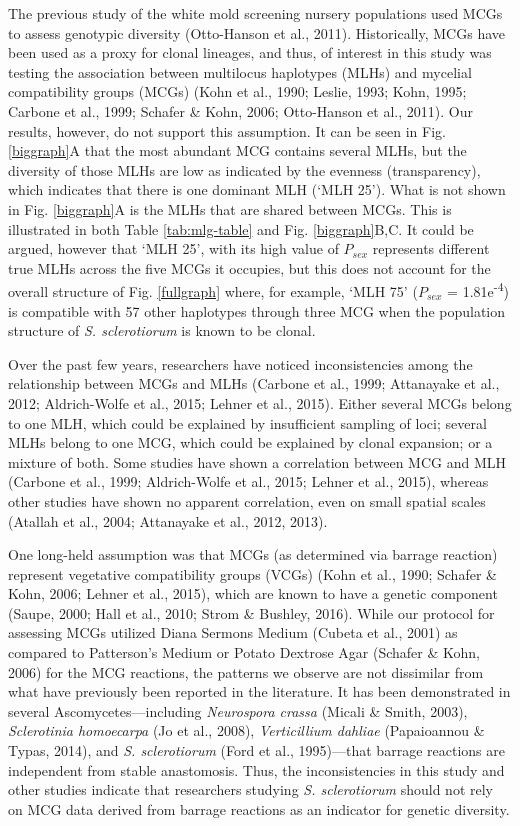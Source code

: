 \documentclass[fleqn,10pt,lineno]{wlpeerj} %
\theoremstyle{definition}
\theoremstyle{definition}
\theoremstyle{definition}
\theoremstyle{remark}
\begin{document}
The previous study of the white mold screening nursery populations used
MCGs to assess genotypic diversity (Otto-Hanson et al., 2011).
Historically, MCGs have been used as a proxy for clonal lineages, and
thus, of interest in this study was testing the association between
multilocus haplotypes (MLHs) and mycelial compatibility groups (MCGs)
(Kohn et al., 1990; Leslie, 1993; Kohn, 1995; Carbone et al., 1999;
Schafer \& Kohn, 2006; Otto-Hanson et al., 2011). Our results, however,
do not support this assumption. It can be seen in Fig. \ref{biggraph}A
that the most abundant MCG contains several MLHs, but the diversity of
those MLHs are low as indicated by the evenness (transparency), which
indicates that there is one dominant MLH (`MLH 25'). What is not shown
in Fig. \ref{biggraph}A is the MLHs that are shared between MCGs. This
is illustrated in both Table \ref{tab:mlg-table} and Fig.
\ref{biggraph}B,C. It could be argued, however that `MLH 25', with its
high value of \(P_{sex}\) represents different true MLHs across the five
MCGs it occupies, but this does not account for the overall structure of
Fig. \ref{fullgraph} where, for example, `MLH 75' (\(P_{sex}\) =
1.81e\textsuperscript{-4}) is compatible with 57 other haplotypes
through three MCG when the population structure of \emph{S.
sclerotiorum} is known to be clonal.

Over the past few years, researchers have noticed inconsistencies among
the relationship between MCGs and MLHs (Carbone et al., 1999; Attanayake
et al., 2012; Aldrich-Wolfe et al., 2015; Lehner et al., 2015). Either
several MCGs belong to one MLH, which could be explained by insufficient
sampling of loci; several MLHs belong to one MCG, which could be
explained by clonal expansion; or a mixture of both. Some studies have
shown a correlation between MCG and MLH (Carbone et al., 1999;
Aldrich-Wolfe et al., 2015; Lehner et al., 2015), whereas other studies
have shown no apparent correlation, even on small spatial scales
(Atallah et al., 2004; Attanayake et al., 2012, 2013).

One long-held assumption was that MCGs (as determined via barrage
reaction) represent vegetative compatibility groups (VCGs) (Kohn et al.,
1990; Schafer \& Kohn, 2006; Lehner et al., 2015), which are known to
have a genetic component (Saupe, 2000; Hall et al., 2010; Strom \&
Bushley, 2016). While our protocol for assessing MCGs utilized Diana
Sermons Medium (Cubeta et al., 2001) as compared to Patterson's Medium
or Potato Dextrose Agar (Schafer \& Kohn, 2006) for the MCG reactions,
the patterns we observe are not dissimilar from what have previously
been reported in the literature. It has been demonstrated in several
Ascomycetes---including \emph{Neurospora crassa} (Micali \& Smith,
2003), \emph{Sclerotinia homoecarpa} (Jo et al., 2008),
\emph{Verticillium dahliae} (Papaioannou \& Typas, 2014), and \emph{S.
sclerotiorum} (Ford et al., 1995)---that barrage reactions are
independent from stable anastomosis. Thus, the inconsistencies in this
study and other studies indicate that researchers studying \emph{S.
sclerotiorum} should not rely on MCG data derived from barrage reactions
as an indicator for genetic diversity.
\end{document}
